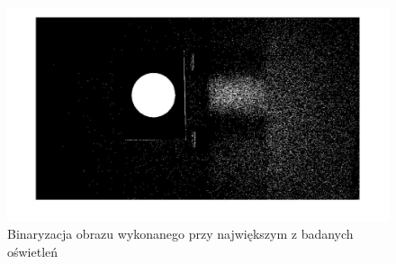 \begin{figure}[h]
	\centering
	\includegraphics[width=\textwidth]{bin3.jpg}
	\caption{Binaryzacja obrazu wykonanego przy największym z badanych oświetleń}
	\label{fig:bin3}
\end{figure}
